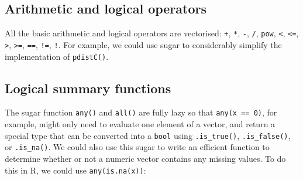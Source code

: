 \hypertarget{arithmetic-and-logical-operators}{%
\subsection{Arithmetic and logical
operators}\label{arithmetic-and-logical-operators}}

All the basic arithmetic and logical operators are vectorised:
\texttt{+}, \texttt{*}, \texttt{-}, \texttt{/}, \texttt{pow},
\texttt{\textless{}}, \texttt{\textless{}=}, \texttt{\textgreater{}},
\texttt{\textgreater{}=}, \texttt{==}, \texttt{!=}, \texttt{!}. For
example, we could use sugar to considerably simplify the implementation
of \texttt{pdistC()}.

\begin{Shaded}
\begin{Highlighting}[]
\StringTok{ }
  \OperatorTok{-}\StringTok{ }\OperatorTok{^}\StringTok{ }\NormalTok{)}
\NormalTok{\}}
\end{Highlighting}
\end{Shaded}

\begin{Shaded}
\begin{Highlighting}[]
 

  \NormalTok{));}
\NormalTok{\}}
\end{Highlighting}
\end{Shaded}

\hypertarget{logical-summary-functions}{%
\subsection{Logical summary functions}\label{logical-summary-functions}}

The sugar function \texttt{any()} and \texttt{all()} are fully lazy so
that \texttt{any(x\ ==\ 0)}, for example, might only need to evaluate
one element of a vector, and return a special type that can be converted
into a \texttt{bool} using \texttt{.is\_true()}, \texttt{.is\_false()},
or \texttt{.is\_na()}. We could also use this sugar to write an
efficient function to determine whether or not a numeric vector contains
any missing values. To do this in R, we could use
\texttt{any(is.na(x))}:

